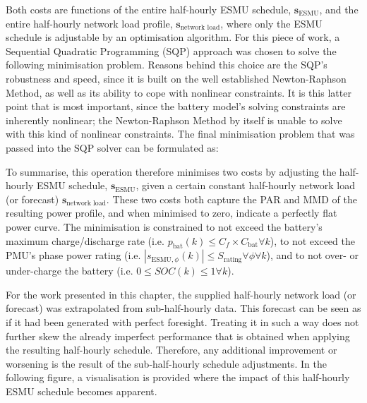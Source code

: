 
Both costs are functions of the entire half-hourly ESMU schedule, $\textbf{s}_\text{ESMU}$, and the entire half-hourly network load profile, $\textbf{s}_\text{network load}$, where only the ESMU schedule is adjustable by an optimisation algorithm.
For this piece of work, a Sequential Quadratic Programming (SQP) approach was chosen to solve the following minimisation problem.
Reasons behind this choice are the SQP's robustness and speed, since it is built on the well established Newton-Raphson Method, as well as its ability to cope with nonlinear constraints.
It is this latter point that is most important, since the battery model's solving constraints are inherently nonlinear; the Newton-Raphson Method by itself is unable to solve with this kind of nonlinear constraints.
The final minimisation problem that was passed into the SQP solver can be formulated as:



To summarise, this operation therefore minimises two costs by adjusting the half-hourly ESMU schedule, $\textbf{s}_\text{ESMU}$, given a certain constant half-hourly network load (or forecast) $\textbf{s}_\text{network load}$.
These two costs both capture the PAR and MMD of the resulting power profile, and when minimised to zero, indicate a perfectly flat power curve.
The minimisation is constrained to not exceed the battery's maximum charge/discharge rate (i.e. $p_\text{bat}(k) \leq C_f \times C_\text{bat} \forall k$), to not exceed the PMU's phase power rating (i.e. $\left|s_{\text{ESMU},\phi}(k)\right| \leq S_\text{rating} \forall \phi \forall k$), and to not over- or under-charge the battery (i.e. $0 \leq SOC(k) \leq 1 \forall k$).

For the work presented in this chapter, the supplied half-hourly network load (or forecast) was extrapolated from sub-half-hourly data.
This forecast can be seen as if it had been generated with perfect foresight.
Treating it in such a way does not further skew the already imperfect performance that is obtained when applying the resulting half-hourly schedule.
Therefore, any additional improvement or worsening is the result of the sub-half-hourly schedule adjustments.
In the following figure, a visualisation is provided where the impact of this half-hourly ESMU schedule becomes apparent.


